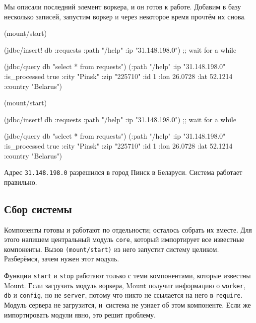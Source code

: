 Мы описали последний элемент воркера, и он готов к работе. Добавим в базу
несколько записей, запустим воркер и через некоторое время прочтём их снова.

\ifx\DEVICETYPE\MOBILE

\begin{english}
  \begin{clojure}
(mount/start)

(jdbc/insert! db :requests
  {:path "/help" :ip "31.148.198.0"})
;; wait for a while

(jdbc/query db "select * from requests")
({:path "/help"
  :ip "31.148.198.0"
  :is_processed true
  :city "Pinsk"
  :zip "225710" :id 1
  :lon 26.0728 :lat 52.1214
  :country "Belarus"})
  \end{clojure}
\end{english}

\else

\begin{english}
  \begin{clojure}
(mount/start)

(jdbc/insert! db :requests {:path "/help" :ip "31.148.198.0"})
;; wait for a while

(jdbc/query db "select * from requests")
({:path "/help" :ip "31.148.198.0" :is_processed true
  :city "Pinsk" :zip "225710" :id 1
  :lon 26.0728 :lat 52.1214 :country "Belarus"})
  \end{clojure}
\end{english}

\fi

Адрес \verb|31.148.198.0| разрешился в город Пинск в Беларуси. Система работает
правильно.

\subsection{Сбор системы}


Компоненты готовы и работают по отдельности; осталось собрать их вместе. Для
этого напишем центральный модуль \verb|core|, который импортирует все известные
компоненты. Вызов \verb|(mount/start)| из него запустит систему
целиком. Разберёмся, зачем нужен этот модуль.

Функции \verb|start| и \verb|stop| работают только с теми компонентами, которые
известны Mount. Если загрузить модуль воркера, Mount получит информацию о
\verb|worker|, \verb|db| и \verb|config|, но не \verb|server|, потому что никто
не ссылается на него в \verb|require|. Модуль сервера не загрузится, и~система
не узнает об этом компоненте. Если же импортировать модули явно, это решит
проблему.

